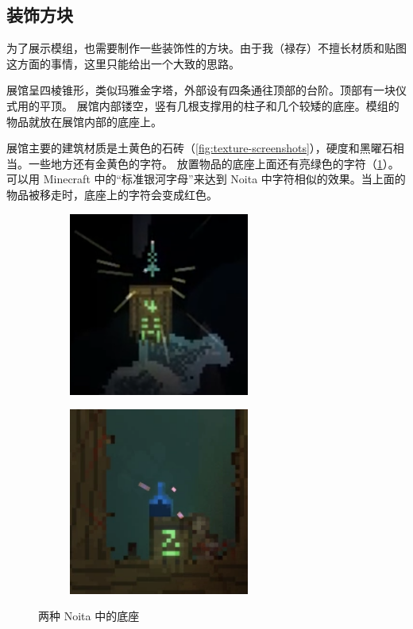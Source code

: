 \documentclass[11pt]{article}
\begin{document}
    \clearpage
    \subsection{装饰方块}\label{subsec:decorative-blocks}
    为了展示模组，也需要制作一些装饰性的方块。由于我（禄存）不擅长材质和贴图这方面的事情，这里只能给出一个大致的思路。

    展馆呈四棱锥形，类似玛雅金字塔，外部设有四条通往顶部的台阶。顶部有一块仪式用的平顶。
    展馆内部镂空，竖有几根支撑用的柱子和几个较矮的底座。模组的物品就放在展馆内部的底座上。

    展馆主要的建筑材质是土黄色的石砖（\ref{fig:texture-screenshots}），硬度和黑曜石相当。一些地方还有金黄色的字符。
    放置物品的底座上面还有亮绿色的字符（\ref{fig:pedestals}）。
    可以用 Minecraft 中的“标准银河字母”来达到 Noita 中字符相似的效果。当上面的物品被移走时，底座上的字符会变成红色。

    \begin{figure}[ht]
        \begin{subfigure}{0.5\textwidth}
            \centering
            \includegraphics[width=16em]{./imgs/Wand_pedestal}
            \caption{}
        \end{subfigure}
        \begin{subfigure}{0.5\textwidth}
            \centering
            \includegraphics[width=16em]{./imgs/Potion_pedestal}
            \caption{}
        \end{subfigure}
        \caption{两种 Noita 中的底座}
        \label{fig:pedestals}
    \end{figure}
\end{document}
